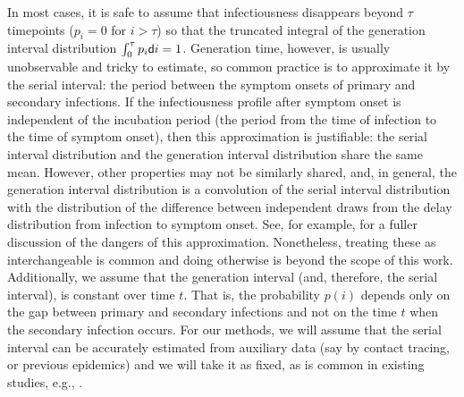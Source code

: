 In most cases, it is safe to assume that
infectiousness disappears beyond $\tau$ timepoints ($p_i = 0$ for $i > \tau$)
so that the truncated integral of the generation interval distribution
$\int_0^\tau p_i\mathsf{d} i = 1$.
Generation time, however, is usually unobservable and tricky to estimate, so
common practice is to approximate it by the serial interval: the period between
the symptom onsets of primary and secondary infections. If the infectiousness
profile after symptom onset is independent of the incubation period (the period
from the time of infection to the time of symptom onset), then this
approximation is justifiable: the serial interval distribution and the
generation interval distribution share the same mean. However, other properties
may not be similarly shared, and, in general, the generation interval
distribution is a convolution of the serial interval distribution with the
distribution of the difference between independent draws from the delay
distribution from infection to symptom onset. See, for example,
\citet{gostic2020practical} for a fuller discussion of the dangers of this
approximation. Nonetheless, treating these as interchangeable is common
\citep{cori2013new} and doing otherwise is beyond the scope of this work. Additionally, we assume
that the generation interval (and, therefore, the serial interval), is constant over time
$t$. That is, the probability $p(i)$ depends only on the gap between primary and
secondary infections and not on the time $t$ when the secondary infection
occurs. For our methods, we will assume that the serial interval can be
accurately estimated from auxiliary data (say by contact tracing, or previous
epidemics) and we will take it as fixed, as is common in existing studies, e.g.,
\cite{cori2013new,abry2020spatial,pascal2022nonsmooth}.

